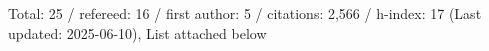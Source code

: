 Total: 25 / refereed: 16 / first author: 5 / citations: 2,566 / h-index: 17 (Last updated: 2025-06-10), List attached below